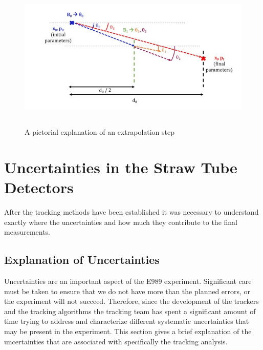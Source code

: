 \documentclass[./Thesis]{subfiles}
\begin{document}
\begin{figure}
	\centerline{\includegraphics[height=70mm]{ExtrapStep.jpeg}}
	\caption[An Extrapolation Step]{ A pictorial explanation of an extrapolation step	\cite{Sask}}
	\label{fig:extrapstep}
\end{figure} 




	
	
\section{Uncertainties in the Straw Tube Detectors}

After the tracking methods have been established it was necessary to understand exactly where the uncertainties and how much they contribute to the final measurements.

\subsection{Explanation of Uncertainties}

	Uncertainties are an important aspect of the E989 experiment.  Significant care must be taken to ensure that we do not have more than the planned errors, or the experiment will not succeed.  Therefore, since the development of the trackers and the tracking algorithms the tracking team has spent a significant amount of time trying to address and characterize different systematic uncertainties that may be present in the experiment.  This section gives a brief explanation of the uncertainties that are associated with specifically the tracking analysis.
\end{document}
